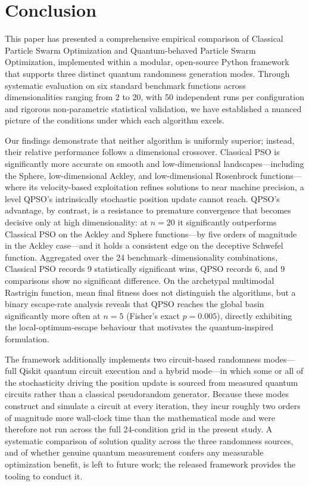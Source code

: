\section{Conclusion}
\label{sec:conclusion}

This paper has presented a comprehensive empirical comparison of Classical Particle Swarm Optimization and Quantum-behaved Particle Swarm Optimization, implemented within a modular, open-source Python framework that supports three distinct quantum randomness generation modes. Through systematic evaluation on six standard benchmark functions across dimensionalities ranging from 2 to 20, with 50 independent runs per configuration and rigorous non-parametric statistical validation, we have established a nuanced picture of the conditions under which each algorithm excels.

Our findings demonstrate that neither algorithm is uniformly superior; instead, their relative performance follows a dimensional crossover. Classical PSO is significantly more accurate on smooth and low-dimensional landscapes---including the Sphere, low-dimensional Ackley, and low-dimensional Rosenbrock functions---where its velocity-based exploitation refines solutions to near machine precision, a level QPSO's intrinsically stochastic position update cannot reach. QPSO's advantage, by contrast, is a resistance to premature convergence that becomes decisive only at high dimensionality: at $n = 20$ it significantly outperforms Classical PSO on the Ackley and Sphere functions---by five orders of magnitude in the Ackley case---and it holds a consistent edge on the deceptive Schwefel function. Aggregated over the 24 benchmark--dimensionality combinations, Classical PSO records 9 statistically significant wins, QPSO records 6, and 9 comparisons show no significant difference. On the archetypal multimodal Rastrigin function, mean final fitness does not distinguish the algorithms, but a binary escape-rate analysis reveals that QPSO reaches the global basin significantly more often at $n = 5$ (Fisher's exact $p = 0.005$), directly exhibiting the local-optimum-escape behaviour that motivates the quantum-inspired formulation.

The framework additionally implements two circuit-based randomness modes---full Qiskit quantum circuit execution and a hybrid mode---in which some or all of the stochasticity driving the position update is sourced from measured quantum circuits rather than a classical pseudorandom generator. Because these modes construct and simulate a circuit at every iteration, they incur roughly two orders of magnitude more wall-clock time than the mathematical mode and were therefore not run across the full 24-condition grid in the present study. A systematic comparison of solution quality across the three randomness sources, and of whether genuine quantum measurement confers any measurable optimization benefit, is left to future work; the released framework provides the tooling to conduct it.

